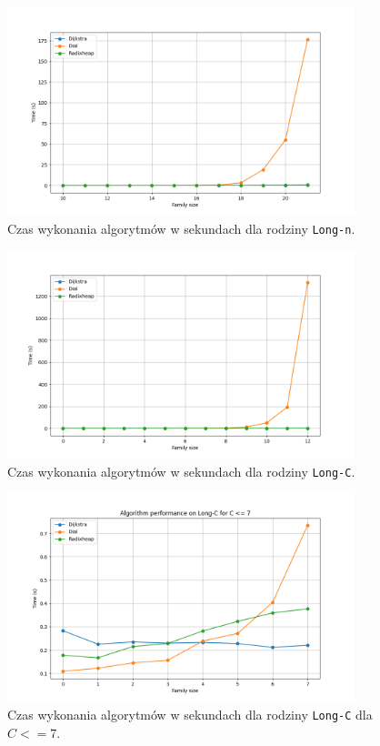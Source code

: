 \documentclass{article}
\begin{document}
\begin{figure}[H]
    \centering
    \includegraphics[width=0.9\textwidth]{Long-n.png}
    \caption{Czas wykonania algorytmów w sekundach dla rodziny \texttt{Long-n}.}
\end{figure}

\begin{figure}[H]
    \centering
    \includegraphics[width=0.9\textwidth]{Long-C.png}
    \caption{Czas wykonania algorytmów w sekundach dla rodziny \texttt{Long-C}.}
\end{figure}

\begin{figure}[H]
    \centering
    \includegraphics[width=0.9\textwidth]{smaller_Long-C.png}
    \caption{Czas wykonania algorytmów w sekundach dla rodziny \texttt{Long-C} dla $C <= 7$.}
\end{figure}
\end{document}
